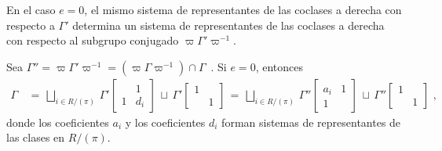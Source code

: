 En el caso $e=0$, el mismo sistema de representantes de las coclases a derecha
con respecto a $\Gamma'$ determina un sistema de representantes de las coclases
a derecha con respecto al subgrupo conjugado $\varpi\Gamma'\varpi^{-1}$.

\begin{propoDescomposicionEnCoclasesADerechaSubgrupoConjugado}
	\label{thm:descomposicionencoclasesaderechasubgrupoconjugado}
	Sea
	\begin{math}
		\Gamma''=\varpi\Gamma'\varpi^{-1}=
			(\varpi\Gamma\varpi^{-1})\cap\Gamma
	\end{math}~.
	Si $e=0$, entonces
	\begin{align*}
		\Gamma & \,=\,\bigsqcup_{i\in R/(\pi)}\,
			\Gamma'\begin{bmatrix} & 1 \\ 1 & d_{i} \end{bmatrix}
				\,\sqcup\,
			\Gamma'\begin{bmatrix} 1 & \\ & 1 \end{bmatrix}
			\,=\,\bigsqcup_{i\in R/(\pi)}\,
			\Gamma''\begin{bmatrix} a_{i} & 1 \\ 1 & \end{bmatrix}
				\,\sqcup\,
			\Gamma''\begin{bmatrix} 1 & \\ & 1 \end{bmatrix}
		\text{ ,}
	\end{align*}
	donde los coeficientes $a_{i}$ y los coeficientes $d_{i}$ forman
	sistemas de representantes de las clases en $R/(\pi)$.
\end{propoDescomposicionEnCoclasesADerechaSubgrupoConjugado}


